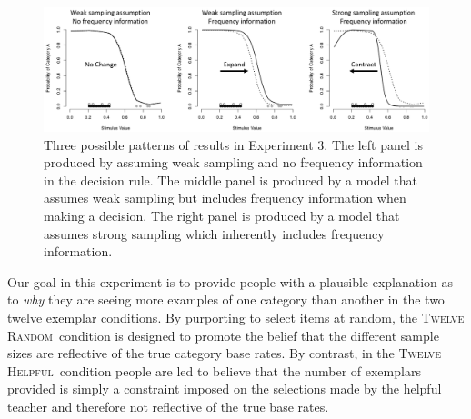 \documentclass[doc,apacite]{apa6}
\newcommand{\random}{\textsc{Twelve Random}}
\newcommand{\helpful}{\textsc{Twelve Helpful}}
\begin{document}
\begin{figure}[t]
\includegraphics[width=1.0\textwidth]{figures/exp3-predictions.png}
\vspace{-1mm}
\caption{%
Three possible patterns of results in Experiment 3.
The left panel is produced by assuming weak sampling and no frequency information in the decision rule.
The middle panel is produced by a model that assumes weak sampling but includes frequency information when making a decision.
The right panel is produced by a model that assumes strong sampling which inherently includes frequency information.
}
\label{fig:exp3-predictions}
\end{figure}


Our goal in this experiment is to provide people with a plausible explanation as to \textit{why} they are seeing more examples of one category than another in the two twelve exemplar conditions. By purporting to select items at random, the \random\ condition is designed to promote the belief that the different sample sizes are reflective of the true category base rates. By contrast, in the \helpful\ condition people are led to believe that the number of exemplars provided is simply a constraint imposed on the selections made by the helpful teacher and therefore not reflective of the true base rates. 
\end{document}
